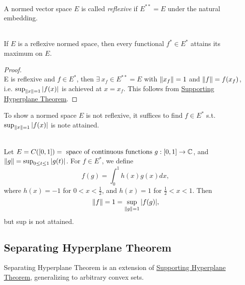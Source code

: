 \begin{definition}[Reflexivity]\ \\
    A normed vector space $E$ is called \textit{reflexive} if $E^{**} = E$ under the natural embedding.
\end{definition}

\begin{proposition}\ \\
If $E$ is a reflexive normed space, then every functional $f^* \in E^*$ attains its maximum on $E$.
\end{proposition}
\begin{proof}\ \\
E is reflexive and $f \in E^*$, then $\exists\ x_f \in E^{**} = E$ with $\norm{x_f} = 1$ and $\norm{f} = f(x_f)$, i.e. $\sup_{\norm{x} = 1} \abs{f(x)}$ is achieved at $x = x_f$. This follows from \hyperref[SHT]{Supporting Hyperplane Theorem}.
\end{proof}

\np To show a normed space $E$ is not reflexive, it suffices to find $f \in E^*$ s.t. $\sup_{\norm{x} = 1} \abs{f(x)}$ is note attained. 

\begin{example}\ \\
Let $E = C([0,1]) = \text{ space of continuous functions } g: [0,1] \to \mathbb{C}$, and $\norm{g} = \sup_{0 \leq t\leq 1} \abs{g(t)}$. For $f \in E^*$, we define
\begin{equation*}
    f(g) = \int_0^1 h(x) g(x) dx,
\end{equation*}
where $h(x) = -1$ for $0  < x < \frac{1}{2}$, and $h(x) = 1$ for $\frac{1}{2} < x < 1$. Then
\begin{equation*}
    \norm{f} = 1 = \sup_{\norm{g} = 1} \abs{f(g)},
\end{equation*}
but sup is not attained.
\end{example}

\subsection{Separating Hyperplane Theorem}
\begin{remark}
Separating Hyperplane Theorem is an extension of \hyperref[SHT]{Supporting Hyperplane Theorem}, generalizing to arbitrary convex sets.
\end{remark}

